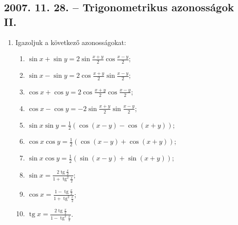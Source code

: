 \documentclass{article}
\newenvironment{abc}{\begin{enumerate}[label=\textit{\alph*})]}{\end{enumerate}}
\newcommand{\tg}{\mathop{\mathrm{tg}}\nolimits}
\begin{document}
\subsection*{2007. 11. 28. -- Trigonometrikus azonosságok II.}
\begin{enumerate}
\item Igazoljuk a következő azonosságokat:
\begin{abc}
\item $\sin x+\sin y=2\sin\displaystyle{\frac{x+y}{2}}\cos\displaystyle{\frac{x-y}{2}}$;
\item $\sin x-\sin y=2\cos\displaystyle{\frac{x+y}{2}}\sin\displaystyle{\frac{x-y}{2}}$;
\item $\cos x+\cos y=2\cos\displaystyle{\frac{x+y}{2}}\cos\displaystyle{\frac{x-y}{2}}$;
\item $\cos x-\cos y=-2\sin\displaystyle{\frac{x+y}{2}}\sin\displaystyle{\frac{x-y}{2}}$;
\item $\sin x\sin y=\displaystyle{\frac{1}{2}}(\cos(x-y)-\cos(x+y))$;
\item $\cos x\cos y=\displaystyle{\frac{1}{2}}(\cos(x-y)+\cos(x+y))$;
\item $\sin x\cos y=\displaystyle{\frac{1}{2}}(\sin(x-y)+\sin(x+y))$;
\item $\sin x=\displaystyle{\frac{2\tg\displaystyle{\frac{x}{2}}}{1+\tg^2\displaystyle{\frac{x}{2}}}}$;
\item $\cos x=\displaystyle{\frac{1-\tg\displaystyle{\frac{x}{2}}}{1+\tg^2\displaystyle{\frac{x}{2}}}}$;
\item $\tg x=\displaystyle{\frac{2\tg\displaystyle{\frac{x}{2}}}{1-\tg^2\displaystyle{\frac{x}{2}}}}$.
\end{abc}
\end{enumerate}
\end{document}
